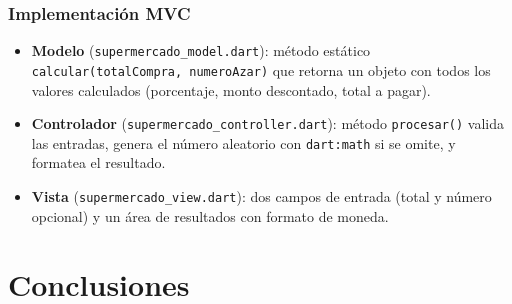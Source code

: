 \documentclass[12pt,a4paper]{article}
\begin{document}
\subsubsection{Implementación MVC}

\begin{itemize}
  \item \textbf{Modelo} (\texttt{supermercado\_model.dart}): método estático \texttt{calcular(totalCompra, numeroAzar)} que retorna un objeto con todos los valores calculados (porcentaje, monto descontado, total a pagar).
  \item \textbf{Controlador} (\texttt{supermercado\_controller.dart}): método \texttt{procesar()} valida las entradas, genera el número aleatorio con \texttt{dart:math} si se omite, y formatea el resultado.
  \item \textbf{Vista} (\texttt{supermercado\_view.dart}): dos campos de entrada (total y número opcional) y un área de resultados con formato de moneda.
\end{itemize}

\section{Conclusiones}
\end{document}
